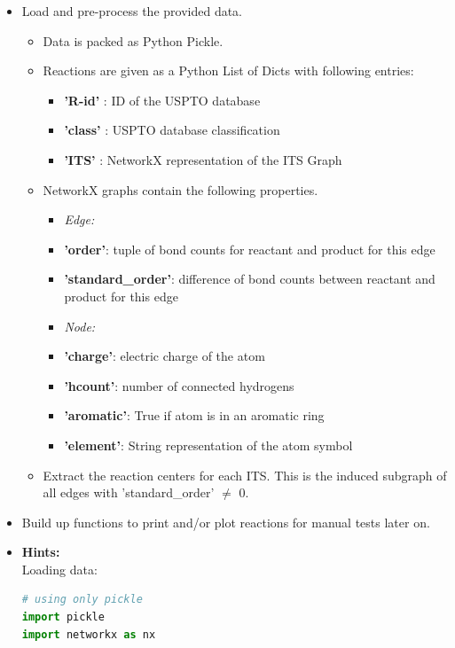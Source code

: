 \documentclass[a4,12pt]{article}
\theoremstyle{plain}
\numberwithin{theorem}{section}
\begin{document}
\begin{itemize}
\item Load and pre-process the provided data.
    \begin{itemize}
	\item Data is packed as Python Pickle.
	\item Reactions are given as a Python List of Dicts with following entries:
	     \begin{itemize}
	        \item \textbf{'R-id'} : ID of the USPTO database
	        \item \textbf{'class'} : USPTO database classification
	        \item \textbf{'ITS'} : NetworkX representation of the ITS Graph
		 \end{itemize}
    \item NetworkX graphs contain the following properties.
    		\begin{itemize}
    		    \item \textit{Edge:} 
    		    \item[] \textbf{'order'}: tuple of bond counts for reactant and product for this edge
    		    \item[] \textbf{'standard\_order'}: difference of bond counts between reactant and product for this edge
    		    \item  \textit{Node:} 
    		    \item[] \textbf{'charge'}: electric charge of the atom
    		    \item[] \textbf{'hcount'}: number of connected hydrogens
    		    \item[] \textbf{'aromatic'}: True if atom is in an aromatic ring
    		    \item[] \textbf{'element'}: String representation of the atom symbol
    		\end{itemize}
    \item Extract the reaction centers for each ITS. This is the induced subgraph of all edges with 'standard\_order' $\neq$ 0.
	\end{itemize}
\item Build up functions to print and/or plot reactions for manual tests later on.

\item \textbf{Hints:}\\
Loading data:
\begin{lstlisting}[language=Python]
# using only pickle
import pickle
import networkx as nx


\end{lstlisting}
\end{itemize}
\end{document}
